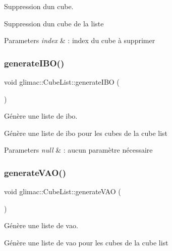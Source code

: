 Suppression d\textquotesingle{}un cube. 

Suppression d\textquotesingle{}un cube de la liste


\begin{DoxyParams}{Parameters}
{\em index} & \+: index du cube à supprimer \\
\hline
\end{DoxyParams}
\mbox{\label{classglimac_1_1CubeList_a179fb745e2097440a88f6818a14a457e}} 
\subsubsection{\texorpdfstring{generate\+I\+B\+O()}{generateIBO()}}
{\footnotesize\ttfamily void glimac\+::\+Cube\+List\+::generate\+I\+BO (\begin{DoxyParamCaption}{ }\end{DoxyParamCaption})}



Génère une liste de ibo. 

Génère une liste de ibo pour les cubes de la cube list


\begin{DoxyParams}{Parameters}
{\em null} & \+: aucun paramètre nécessaire \\
\hline
\end{DoxyParams}
\mbox{\label{classglimac_1_1CubeList_a098351d44d9b56a3ca3f4643a0dec302}} 
\subsubsection{\texorpdfstring{generate\+V\+A\+O()}{generateVAO()}}
{\footnotesize\ttfamily void glimac\+::\+Cube\+List\+::generate\+V\+AO (\begin{DoxyParamCaption}{ }\end{DoxyParamCaption})}



Génère une liste de vao. 

Génère une liste de vao pour les cubes de la cube list



